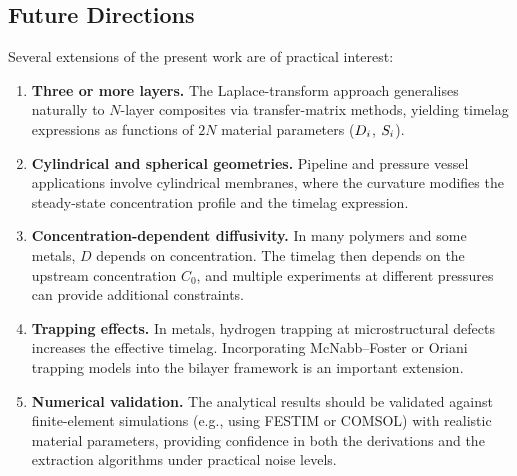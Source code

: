 \subsection{Future Directions}

Several extensions of the present work are of practical interest:
\begin{enumerate}
  \item \textbf{Three or more layers.}
    The Laplace-transform approach generalises naturally to $N$-layer
    composites via transfer-matrix methods, yielding timelag expressions
    as functions of $2N$ material parameters ($D_{i}$, $S_{i}$).
  \item \textbf{Cylindrical and spherical geometries.}
    Pipeline and pressure vessel applications involve cylindrical membranes,
    where the curvature modifies the steady-state concentration profile and
    the timelag expression.
  \item \textbf{Concentration-dependent diffusivity.}
    In many polymers and some metals, $D$ depends on concentration.  The
    timelag then depends on the upstream concentration $C_0$, and
    multiple experiments at different pressures can provide additional
    constraints.
  \item \textbf{Trapping effects.}
    In metals, hydrogen trapping at microstructural defects increases the
    effective timelag.  Incorporating McNabb--Foster or Oriani trapping models
    into the bilayer framework is an important extension.
  \item \textbf{Numerical validation.}
    The analytical results should be validated against finite-element
    simulations (e.g., using FESTIM or COMSOL) with realistic material
    parameters, providing confidence in both the derivations and the
    extraction algorithms under practical noise levels.
\end{enumerate}
